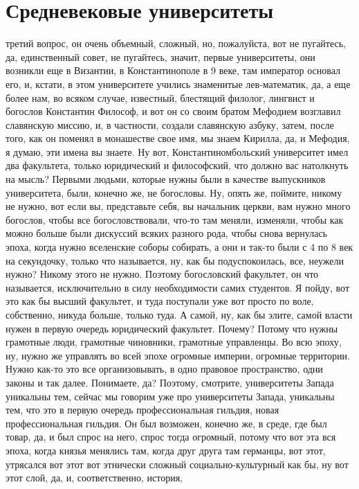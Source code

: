 \section{Средневековые университеты}

третий вопрос, он очень объемный,
сложный, но, пожалуйста, вот не пугайтесь, да, единственный совет, не пугайтесь,
значит, первые университеты, они возникли еще в Византии, в Константинополе в 9
веке, там император основал его, и, кстати, в этом университете учились
знаменитые лев-математик, да, а еще более нам, во всяком случае, известный,
блестящий филолог, лингвист и богослов Константин Философ, и вот он со своим
братом Мефодием возглавил славянскую миссию, и, в частности, создали славянскую
азбуку, затем, после того, как он поменял в монашестве свое имя, мы знаем
Кирилла, да, и Мефодия, я думаю, эти имена вы знаете. Ну вот,
Константиномбольский университет имел два факультета, только юридический и
философский, что должно вас натолкнуть на мысль? Первыми людьми, которые нужны
были в качестве выпускников университета, были, конечно же, не богословы. Ну,
опять же, поймите, никому не нужно, вот если вы, представьте себя, вы начальник
церкви, вам нужно много богослов, чтобы все богословствовали, что-то там меняли,
изменяли, чтобы как можно больше были дискуссий всяких разного рода, чтобы снова
вернулась эпоха, когда нужно вселенские соборы собирать, а они и так-то были с 4
по 8 век на секундочку, только что называется, ну, как бы подуспокоилась, все,
неужели нужно? Никому этого не нужно. Поэтому богословский факультет, он что
называется, исключительно в силу необходимости самих студентов. Я пойду, вот это
как бы высший факультет, и туда поступали уже вот просто по воле, собственно,
никуда больше, только туда. А самой, ну, как бы элите, самой власти нужен в
первую очередь юридический факультет. Почему? Потому что нужны грамотные люди,
грамотные чиновники, грамотные управленцы. Во всю эпоху, ну, нужно же управлять
во всей эпохе огромные империи, огромные территории. Нужно как-то это все
организовывать, в одно правовое пространство, одни законы и так далее.
Понимаете, да? Поэтому, смотрите, университеты Запада уникальны тем, сейчас мы
говорим уже про университеты Запада, уникальны тем, что это в первую очередь
профессиональная гильдия, новая профессиональная гильдия. Он был возможен,
конечно же, в среде, где был товар, да, и был спрос на него, спрос тогда
огромный, потому что вот эта вся эпоха, когда князья менялись там, когда друг
друга там германцы, вот этот, утрясался вот этот вот этнически сложный
социально-культурный как бы, ну вот этот слой, да, и, соответственно, история,
